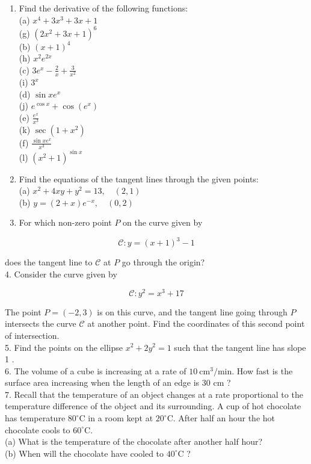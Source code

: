 \documentclass[10pt]{article}
\begin{document}
\begin{enumerate}
  \item Find the derivative of the following functions:\\
(a) $x^{4}+3 x^{3}+3 x+1$\\
(g) $\left(2 x^{2}+3 x+1\right)^{6}$\\
(b) $(x+1)^{4}$\\
(h) $x^{2} e^{2 x}$\\
(c) $3 e^{x}-\frac{2}{x}+\frac{3}{x^{2}}$\\
(i) $3^{x}$\\
(d) $\sin x e^{x}$\\
(j) $e^{\cos x}+\cos \left(e^{x}\right)$\\
(e) $\frac{e^{x}}{x^{3}}$\\
(k) $\sec \left(1+x^{2}\right)$\\
(f) $\frac{\sin x e^{x}}{x^{3}}$\\
(l) $\left(x^{2}+1\right)^{\sin x}$
  \item Find the equations of the tangent lines through the given points:\\
(a) $x^{2}+4 x y+y^{2}=13, \quad(2,1)$\\
(b) $y=(2+x) e^{-x}, \quad(0,2)$
  \item For which non-zero point $P$ on the curve given by
\end{enumerate}

$$
\mathcal{C}: y=(x+1)^{3}-1
$$

does the tangent line to $\mathcal{C}$ at $P$ go through the origin?\\
4. Consider the curve given by

$$
\mathcal{C}: y^{2}=x^{3}+17
$$

The point $P=(-2,3)$ is on this curve, and the tangent line going through $P$ intersects the curve $\mathcal{C}$ at another point. Find the coordinates of this second point of intersection.\\
5. Find the points on the ellipse $x^{2}+2 y^{2}=1$ such that the tangent line has slope 1 .\\
6. The volume of a cube is increasing at a rate of $10 \mathrm{~cm}^{3} / \mathrm{min}$. How fast is the surface area increasing when the length of an edge is 30 cm ?\\
7. Recall that the temperature of an object changes at a rate proportional to the temperature difference of the object and its surrounding. A cup of hot chocolate has temperature $80^{\circ} \mathrm{C}$ in a room kept at $20^{\circ} \mathrm{C}$. After half an hour the hot chocolate cools to $60^{\circ} \mathrm{C}$.\\
(a) What is the temperature of the chocolate after another half hour?\\
(b) When will the chocolate have cooled to $40^{\circ} \mathrm{C}$ ?
\end{document}
